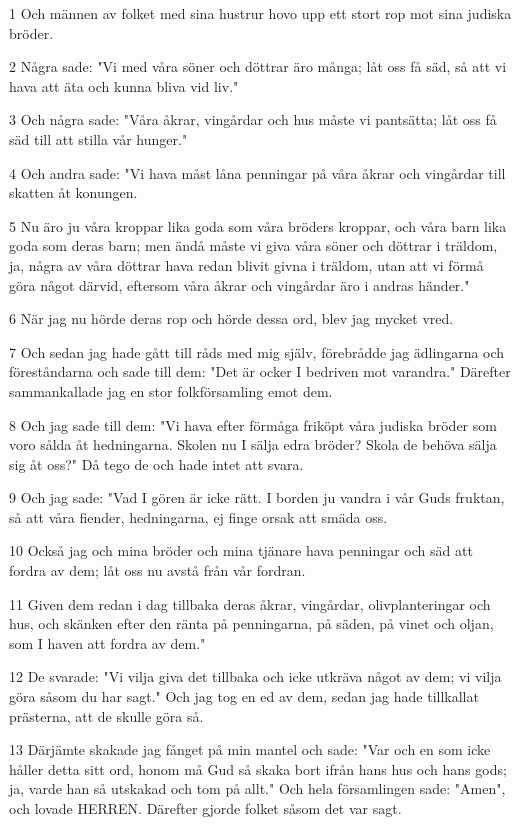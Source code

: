 \par 1 Och männen av folket med sina hustrur hovo upp ett stort rop mot sina judiska bröder.
\par 2 Några sade: "Vi med våra söner och döttrar äro många; låt oss få säd, så att vi hava att äta och kunna bliva vid liv."
\par 3 Och några sade: "Våra åkrar, vingårdar och hus måste vi pantsätta; låt oss få säd till att stilla vår hunger."
\par 4 Och andra sade: "Vi hava måst låna penningar på våra åkrar och vingårdar till skatten åt konungen.
\par 5 Nu äro ju våra kroppar lika goda som våra bröders kroppar, och våra barn lika goda som deras barn; men ändå måste vi giva våra söner och döttrar i träldom, ja, några av våra döttrar hava redan blivit givna i träldom, utan att vi förmå göra något därvid, eftersom våra åkrar och vingårdar äro i andras händer."
\par 6 När jag nu hörde deras rop och hörde dessa ord, blev jag mycket vred.
\par 7 Och sedan jag hade gått till råds med mig själv, förebrådde jag ädlingarna och föreståndarna och sade till dem: "Det är ocker I bedriven mot varandra." Därefter sammankallade jag en stor folkförsamling emot dem.
\par 8 Och jag sade till dem: "Vi hava efter förmåga friköpt våra judiska bröder som voro sålda åt hedningarna. Skolen nu I sälja edra bröder? Skola de behöva sälja sig åt oss?" Då tego de och hade intet att svara.
\par 9 Och jag sade: "Vad I gören är icke rätt. I borden ju vandra i vår Guds fruktan, så att våra fiender, hedningarna, ej finge orsak att smäda oss.
\par 10 Också jag och mina bröder och mina tjänare hava penningar och säd att fordra av dem; låt oss nu avstå från vår fordran.
\par 11 Given dem redan i dag tillbaka deras åkrar, vingårdar, olivplanteringar och hus, och skänken efter den ränta på penningarna, på säden, på vinet och oljan, som I haven att fordra av dem."
\par 12 De svarade: "Vi vilja giva det tillbaka och icke utkräva något av dem; vi vilja göra såsom du har sagt." Och jag tog en ed av dem, sedan jag hade tillkallat prästerna, att de skulle göra så.
\par 13 Därjämte skakade jag fånget på min mantel och sade: "Var och en som icke håller detta sitt ord, honom må Gud så skaka bort ifrån hans hus och hans gods; ja, varde han så utskakad och tom på allt." Och hela församlingen sade: "Amen", och lovade HERREN. Därefter gjorde folket såsom det var sagt.
